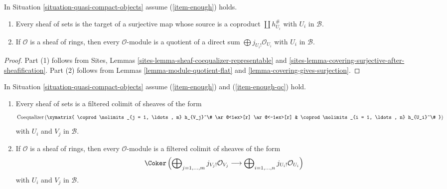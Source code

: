 \begin{lemma}
\label{lemma-module-quotient-direct-sum}
In Situation \ref{situation-quasi-compact-objects} assume
(\ref{item-enough}) holds.
\begin{enumerate}
\item Every sheaf of sets is the target of a surjective map
whose source is a coproduct $\coprod h_{U_i}^\#$ with $U_i$ in $\mathcal{B}$.
\item If $\mathcal{O}$ is a sheaf of rings, then every $\mathcal{O}$-module
is a quotient of a direct sum $\bigoplus\nolimits j_{U_i!}\mathcal{O}_{U_i}$
with $U_i$ in $\mathcal{B}$.
\end{enumerate}
\end{lemma}

\begin{proof}
Part (1) follows from Sites, Lemmas
\ref{sites-lemma-sheaf-coequalizer-representable} and
\ref{sites-lemma-covering-surjective-after-sheafification}.
Part (2) follows from Lemmas \ref{lemma-module-quotient-flat} and
\ref{lemma-covering-gives-surjection}.
\end{proof}

\begin{lemma}
\label{lemma-module-filtered-colimit-constructibles}
In Situation \ref{situation-quasi-compact-objects} assume
(\ref{item-enough}) and (\ref{item-enough-qc}) hold.
\begin{enumerate}
\item Every sheaf of sets is a filtered colimit of sheaves of the form
\begin{equation}
\label{equation-towards-constructible-sets}
\text{Coequalizer}\left(
\xymatrix{
\coprod\nolimits_{j = 1, \ldots, m} h_{V_j}^\#
\ar@<1ex>[r] \ar@<-1ex>[r] &
\coprod\nolimits_{i = 1, \ldots, n} h_{U_i}^\#
}
\right)
\end{equation}
with $U_i$ and $V_j$ in $\mathcal{B}$.
\item If $\mathcal{O}$ is a sheaf of rings, then every $\mathcal{O}$-module
is a filtered colimit of sheaves of the form
\begin{equation}
\label{equation-towards-constructible}
\Coker\left(
\bigoplus\nolimits_{j = 1, \ldots, m} j_{V_j!}\mathcal{O}_{V_j}
\longrightarrow
\bigoplus\nolimits_{i = 1, \ldots, n} j_{U_i!}\mathcal{O}_{U_i}
\right)
\end{equation}
with $U_i$ and $V_j$ in $\mathcal{B}$.
\end{enumerate}
\end{lemma}

